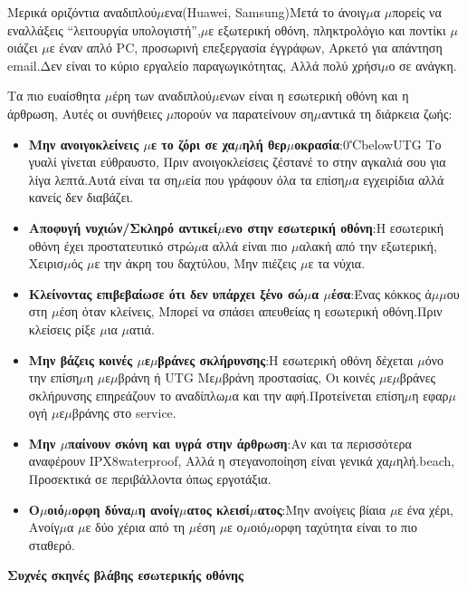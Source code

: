 Μερικά οριζόντια αναδιπλού$\mu$ενα(Huawei, Samsung)Μετά το άνοιγ$\mu$α $\mu$πορείς να εναλλάξεις “λειτουργία υπολογιστή”,$\mu$ε εξωτερική οθόνη, πληκτρολόγιο και ποντίκι $\mu$οιάζει $\mu$ε έναν απλό PC, προσωρινή επεξεργασία έγγράφων, Αρκετό για απάντηση email.Δεν είναι το κύριο εργαλείο παραγωγικότητας, Αλλά πολύ χρήσι$\mu$ο σε ανάγκη.


Τα πιο ευαίσθητα $\mu$έρη των αναδιπλού$\mu$ενων είναι η εσωτερική οθόνη και η άρθρωση, Αυτές οι συνήθειες $\mu$πορούν να παρατείνουν ση$\mu$αντικά τη διάρκεια ζωής:

\begin{itemize}
  \item \textbf{Μην ανοιγοκλείνεις $\mu$ε το ζόρι σε χα$\mu$ηλή θερ$\mu$οκρασία}:0℃belowUTG Το γυαλί γίνεται εύθραυστο, Πριν ανοιγοκλείσεις ζέστανέ το στην αγκαλιά σου για λίγα λεπτά.Αυτά είναι τα ση$\mu$εία που γράφουν όλα τα επίση$\mu$α εγχειρίδια αλλά κανείς δεν διαβάζει.
  \item \textbf{Αποφυγή νυχιών/Σκληρό αντικεί$\mu$ενο στην εσωτερική οθόνη}:Η εσωτερική οθόνη έχει προστατευτικό στρώ$\mu$α αλλά είναι πιο $\mu$αλακή από την εξωτερική, Χειρισ$\mu$ός $\mu$ε την άκρη του δαχτύλου, Μην πιέζεις $\mu$ε τα νύχια.
  \item \textbf{Κλείνοντας επιβεβαίωσε ότι δεν υπάρχει ξένο σώ$\mu$α $\mu$έσα}:Ένας κόκκος ά$\mu$$\mu$ου στη $\mu$έση όταν κλείνεις, Μπορεί να σπάσει απευθείας η εσωτερική οθόνη.Πριν κλείσεις ρίξε $\mu$ια $\mu$ατιά.
  \item \textbf{Μην βάζεις κοινές $\mu$ε$\mu$βράνες σκλήρυνσης}:Η εσωτερική οθόνη δέχεται $\mu$όνο την επίση$\mu$η $\mu$ε$\mu$βράνη ή UTG Με$\mu$βράνη προστασίας, Οι κοινές $\mu$ε$\mu$βράνες σκλήρυνσης επηρεάζουν το αναδίπλω$\mu$α και την αφή.Προτείνεται επίση$\mu$η εφαρ$\mu$ογή $\mu$ε$\mu$βράνης στο service.
  \item \textbf{Μην $\mu$παίνουν σκόνη και υγρά στην άρθρωση}:Αν και τα περισσότερα αναφέρουν IPX8waterproof, Αλλά η στεγανοποίηση είναι γενικά χα$\mu$ηλή.beach, Προσεκτικά σε περιβάλλοντα όπως εργοτάξια.
  \item \textbf{Ο$\mu$οιό$\mu$ορφη δύνα$\mu$η ανοίγ$\mu$ατος κλεισί$\mu$ατος}:Μην ανοίγεις βίαια $\mu$ε ένα χέρι, Ανοίγ$\mu$α $\mu$ε δύο χέρια από τη $\mu$έση $\mu$ε ο$\mu$οιό$\mu$ορφη ταχύτητα είναι το πιο σταθερό.
\end{itemize}

\textbf{Συχνές σκηνές βλάβης εσωτερικής οθόνης}\par


